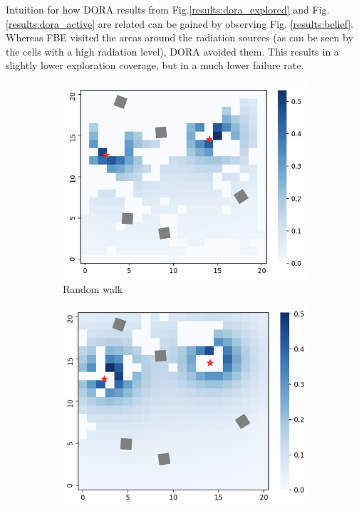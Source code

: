 Intuition for how \ac{DORA} results from Fig.\ref{results:dora_explored} and Fig. \ref{results:dora_active} are related can be gained by observing Fig. \ref{results:belief}. Whereas \ac{FBE} visited the areas around the radiation sources (as can be seen by the cells with a high radiation level), \ac{DORA} avoided them. This results in a slightly lower exploration coverage, but in a much lower failure rate.

\begin{figure}
    \centering
    \begin{subfigure}{0.45\textwidth}
        \includegraphics[width=\textwidth]{figures/dora_explorer/heatmap_random.png}
        \caption{Random walk}
        \label{results:beliefrandom}
    \end{subfigure}
    \begin{subfigure}{0.45\textwidth}
        \includegraphics[width=\textwidth]{figures/dora_explorer/heatmap_frontier.png}

\end{subfigure}
\end{figure}
